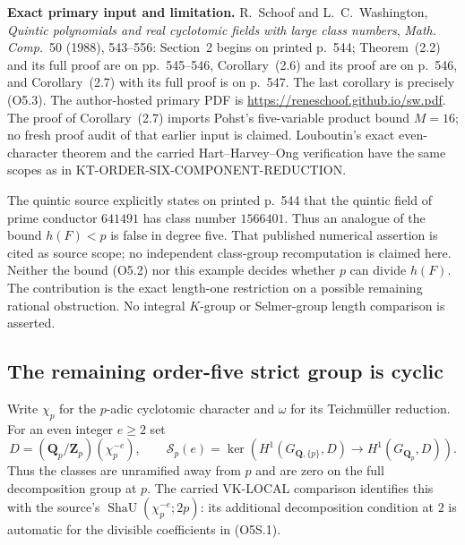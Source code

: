 \documentclass[11pt,a4paper]{article}
\theoremstyle{definition}
\renewcommand{\paragraph}[1]{\par\smallskip\noindent\textbf{#1}\quad\ignorespaces}
\begin{document}
\paragraph{Exact primary input and limitation.}
R.~Schoof and L.~C.~Washington, \emph{Quintic polynomials and real
cyclotomic fields with large class numbers},
\emph{Math. Comp.}~50 (1988), 543--556:
Section~2 begins on printed p.~544; Theorem~(2.2) and its full proof
are on pp.~545--546, Corollary~(2.6) and its proof are on p.~546,
and Corollary~(2.7) with its full proof is on p.~547.
The last corollary is precisely (O5.3).
The author-hosted primary PDF is
\url{https://reneschoof.github.io/sw.pdf}.
The proof of Corollary~(2.7) imports Pohst's five-variable product
bound $M=16$; no fresh proof audit of that earlier input is claimed.
Louboutin's exact even-character theorem and the carried
Hart--Harvey--Ong verification have the same scopes as in
KT-ORDER-SIX-COMPONENT-REDUCTION.

The quintic source explicitly states on printed p.~544 that the
quintic field of prime conductor $641491$ has class number $1566401$.
Thus an analogue of the bound $h(F)<p$ is false in degree five.
That published numerical assertion is cited as source scope; no
independent class-group recomputation is claimed here.
Neither the bound (O5.2) nor this example decides whether
$p$ can divide $h(F)$.  The contribution is the exact length-one
restriction on a possible remaining rational obstruction.
No integral $K$-group or Selmer-group length comparison is asserted.



\subsection{The remaining order-five strict group is cyclic}

Write $\chi_p$ for the $p$-adic cyclotomic character and
$\omega$ for its Teichm\"uller reduction.  For an even integer
$e\ge2$ set
\[
 D=(\mathbf Q_p/\mathbf Z_p)(\chi_p^{-e}),\qquad
 \mathcal S_p(e)=
 \ker\!\left(H^1(G_{\mathbf Q,\{p\}},D)
       \longrightarrow H^1(G_{\mathbf Q_p},D)\right).
 \tag{O5S.1}
\]
Thus the classes are unramified away from $p$ and are zero
on the full decomposition group at $p$.
The carried VK-LOCAL comparison identifies this with the
source's $\operatorname{ShaU}(\chi_p^{-e};2p)$: its additional
decomposition condition at $2$ is automatic for the divisible
coefficients in (O5S.1).
\end{document}
